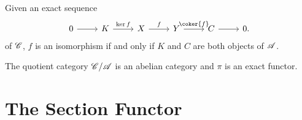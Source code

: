 \documentclass[10pt]{amsart}
\begin{document}
\begin{lem}
  Given an exact sequence 
  $$\begin{tikzcd}
    0 \arrow{r} & K \arrow{r}{\ker{f}} & X \arrow{r}{f} & Y \arrow{r}{\coker{f}} & C \arrow{r} & 0.
  \end{tikzcd}$$ 
  of $\mathscr{C}$, $f$ is an isomorphism if and only if $K$ and $C$ are both objects of $\mathscr{A}$.
\end{lem}

\begin{prop}
  The quotient category $\mathscr{C}/\mathscr{A}$ is an abelian category and $\pi$ is an exact functor.
\end{prop}

\section{The Section Functor}
\end{document}
